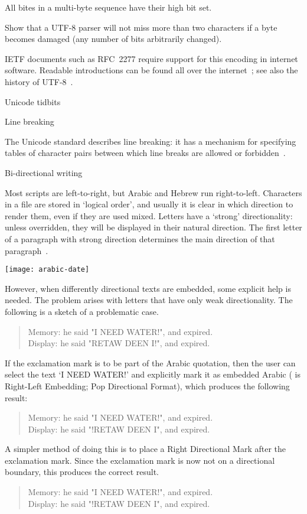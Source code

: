 All bites in a multi-byte sequence have their high bit set.

\begin{594exercise}
Show that a UTF-8 parser will not miss more than two characters
if a byte becomes damaged (any number of bits arbitrarily changed).
\end{594exercise}

IETF documents such as
RFC~2277 require support for this encoding in internet
software. Readable introductions can be found all over the
internet~\cite{utf-faq}; see also the history of UTF-8~\cite{utf-history}.

 {Unicode tidbits}

 {Line breaking}

The Unicode standard describes line breaking: it has a mechanism for 
specifying tables of character pairs between which line breaks are
allowed or forbidden~\cite{unicode-tr14,unicode-line-breaking}.

 {Bi-directional writing}

Most scripts are left-to-right, but Arabic and Hebrew run
right-to-left. Characters in a file are stored in `logical order', and
usually it is clear in which direction to render them, even if they
are used mixed. Letters have a `strong' directionality: unless
overridden, they will be displayed in their natural direction. The
first letter of a paragraph with strong direction determines the main
direction of that paragraph~\cite{unicode-tr9}.

\texttt{[image: arabic-date]}

However, when differently directional texts are
embedded, some explicit help is needed. The problem arises with
letters that have only weak directionality. The following is a sketch
of a problematic case.
\begin{quote}
Memory:  he said "I NEED WATER!", and expired.\\
Display: he said "RETAW DEEN I!", and expired.
\end{quote}
If the exclamation mark is to be part of the Arabic quotation, then
the user can select the text `I NEED WATER!' and explicitly mark it as
embedded Arabic ( is Right-Left Embedding;  Pop
Directional Format), which produces the following result:
\begin{quote}
Memory:  he said "I NEED WATER!", and expired.\\
Display: he said "!RETAW DEEN I", and expired.
\end{quote}
A simpler method of doing this is to place a Right Directional Mark
 after the exclamation mark. Since the exclamation mark is now
not on a directional boundary, this produces the correct result.
\begin{quote}
Memory:  he said "I NEED WATER!", and expired.\\
Display: he said "!RETAW DEEN I", and expired.
\end{quote}


